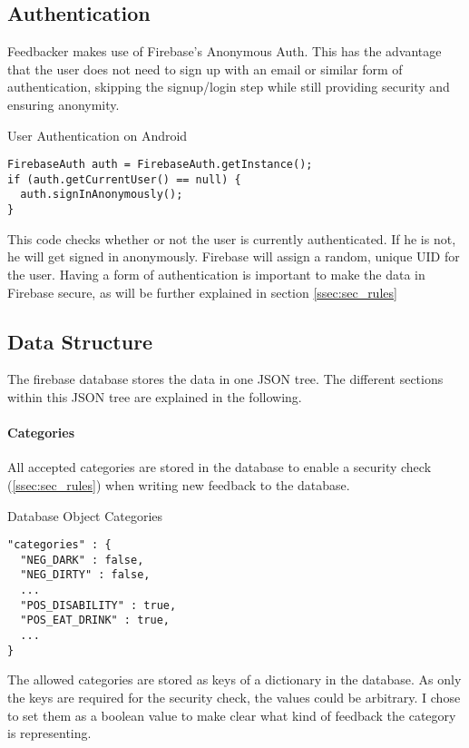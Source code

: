 \subsection{Authentication} \label{sec:auth}
Feedbacker makes use of Firebase's Anonymous Auth. This has the advantage that the user does not need to sign up with an email or similar form of authentication, skipping the signup/login step while still providing security and ensuring anonymity.
\begin{listing}
  \caption{User Authentication on Android}
  \label{mint:auth_android}
  \begin{verbatim}
FirebaseAuth auth = FirebaseAuth.getInstance();
if (auth.getCurrentUser() == null) {
  auth.signInAnonymously();
}
  \end{verbatim}

\end{listing}

This code checks whether or not the user is currently authenticated. If he is not, he will get signed in anonymously. Firebase will assign a random, unique UID for the user. Having a form of authentication is important to make the data in Firebase secure, as will be further explained in section \ref{ssec:sec_rules}

\subsection{Data Structure}\label{ssec:data_structure}
The firebase database stores the data in one JSON tree. The different sections within this JSON tree are explained in the following.

\paragraph{Categories}\label{par:db_cat}
All accepted categories are stored in the database to enable a security check (\ref{ssec:sec_rules}) when writing new feedback to the database.
\begin{listing}[H]
  \caption{Database Object Categories}
  \label{mint:db_categories}
  \begin{verbatim}
"categories" : {
  "NEG_DARK" : false,
  "NEG_DIRTY" : false,
  ...
  "POS_DISABILITY" : true,
  "POS_EAT_DRINK" : true,
  ...
}
  \end{verbatim}
\end{listing}
The allowed categories are stored as keys of a dictionary in the database. As only the keys are required for the security check, the values could be arbitrary. I chose to set them as a boolean value to make clear what kind of feedback the category is representing.


